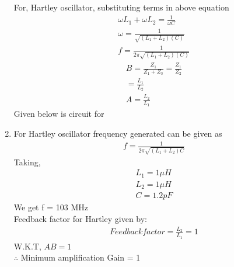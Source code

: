 \begin{enumerate}[label=\thesection.\arabic*.,ref=\thesection.\theenumi]
    For, Hartley oscillator, substituting terms in above equation\\
\begin{align}    
    \omega L_1 + \omega L_2  = \frac{1}{\omega C}\\
    \omega = \frac{1}{\sqrt{(L_1+L_2)(C)}}\\
    f = \frac{1}{2\pi \sqrt{(L_1+L_2)(C)}}
\end{align}
\begin{align}
    B = \frac{Z_1}{Z_1 + Z_3} = \frac{Z_1}{Z_2}\\
      = \frac{L_1}{L_2}\\
    A =  \frac{L_2}{L_1} 
\end{align}
Given below is circuit for 
\item For Hartley oscillator frequency generated can be given as 
\begin{align}
    f = \frac{1}{2\pi\sqrt{(L_1 + L_2)C}}
\end{align}
Taking,
\begin{align}
   L_1 = 1 \mu H\\
   L_2 = 1 \mu H\\
   C = 1.2 pF
\end{align}
We get f = 103 MHz\\
Feedback factor for Hartley given by:
\begin{align}
Feedback factor =\frac{L_2}{L_1}= 1
\end{align}
W.K.T, $AB = 1$\\
$\therefore$ Minimum amplification Gain = 1
\end{enumerate}
